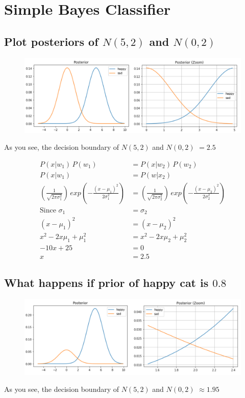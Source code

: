 \documentclass[12pt]{article}
\begin{document}
\section{Simple Bayes Classifier}
\label{sec:bayes}

\subsection{Plot posteriors of $N(5,2)$ and $N(0,2)$}
\begin{figure}[ht]
  \centering
  \includegraphics[width=1\textwidth]{bayes-1.png}
  \end{figure}
As you see, the decision boundary of $N(5,2)$ and $N(0,2)$ $= 2.5$

\begin{align*}
P(x|w_1) \, P(w_1) &= P(x|w_2) \, P(w_2) \\
P(x | w_1) &= P(w | x_2) \\
(\frac{1}{\sqrt{2 \pi \sigma_1^2}}) \, exp (-\frac{(x-\mu_1)^2}{2 \sigma_1^2}) &= (\frac{1}{\sqrt{2 \pi \sigma_2^2}}) \, exp (-\frac{(x-\mu_2)^2}{2 \sigma_2^2}) \\
  \text{Since } \sigma_1 &= \sigma_2 \\
  (x-\mu_1)^2 &= (x-\mu_2)^2 \\
  x^2 - 2 x \mu_1 + \mu_1^2 &= x^2 - 2 x \mu_2 + \mu_2^2 \\
  -10x + 25 &= 0 \\
  x &= 2.5
\end{align*}

\subsection{What happens if prior of happy cat is $0.8$}

\begin{figure}[ht]
  \centering
  \includegraphics[width=1\textwidth]{bayes-2.png}
  \end{figure}
As you see, the decision boundary of $N(5,2)$ and $N(0,2)$ $\approx 1.95$
\end{document}
